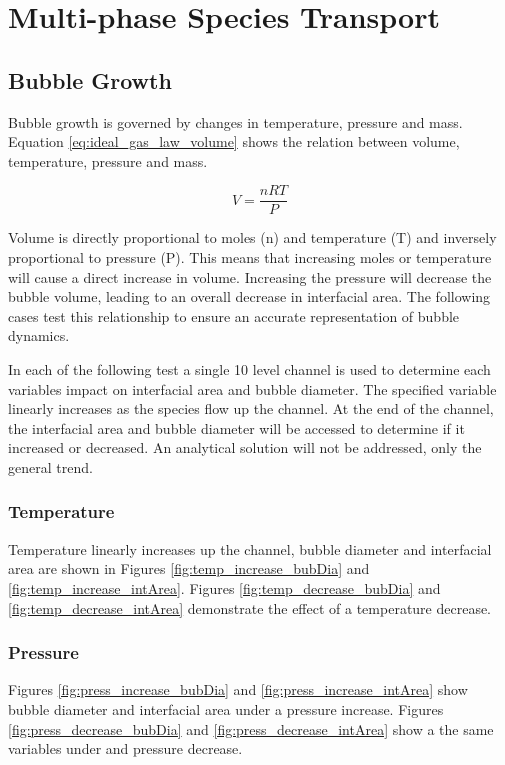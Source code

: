 \newpage

\section{Multi-phase Species Transport}\label{sec:gas_transport}

\subsection{Bubble Growth}
Bubble growth is governed by changes in temperature, pressure and mass. Equation \ref{eq:ideal_gas_law_volume} shows the relation between volume, temperature, pressure and mass. 

\begin{equation}
	V = \frac{nRT}{P}
	\label{eq:ideal_gas_law_volume}
\end{equation}

Volume is directly proportional to moles (n) and temperature (T) and inversely proportional to pressure (P). This means that increasing moles or temperature will cause a direct increase in volume. Increasing the pressure will decrease the bubble volume, leading to an overall decrease in interfacial area. The following cases test this relationship to ensure an accurate representation of bubble dynamics. 

In each of the following test a single 10 level channel is used to determine each variables impact on interfacial area and bubble diameter. The specified variable linearly increases as the species flow up the channel. At the end of the channel, the interfacial area and bubble diameter will be accessed to determine if it increased or decreased. An analytical solution will not be addressed, only the general trend. 

\subsubsection{Temperature}
Temperature linearly increases up the channel, bubble diameter and interfacial area are shown in Figures \ref{fig:temp_increase_bubDia} and \ref{fig:temp_increase_intArea}. Figures \ref{fig:temp_decrease_bubDia} and \ref{fig:temp_decrease_intArea} demonstrate the effect of a temperature decrease.

\subsubsection{Pressure}
Figures \ref{fig:press_increase_bubDia} and \ref{fig:press_increase_intArea} show bubble diameter and interfacial area under a pressure increase. Figures \ref{fig:press_decrease_bubDia} and \ref{fig:press_decrease_intArea} show a the same variables under and pressure decrease.

